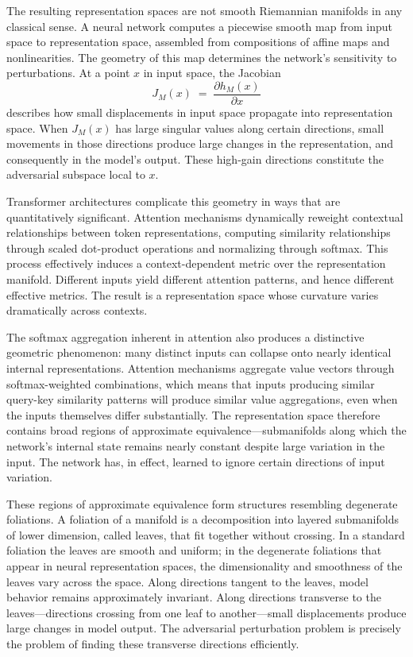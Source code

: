 \documentclass[12pt,a4paper]{article}
\theoremstyle{plain}
\theoremstyle{definition}
\begin{document}
The resulting representation spaces are not smooth Riemannian manifolds in any classical sense. A neural network computes a piecewise smooth map from input space to representation space, assembled from compositions of affine maps and nonlinearities. The geometry of this map determines the network's sensitivity to perturbations. At a point $x$ in input space, the Jacobian
\[
J_M(x) \;=\; \frac{\partial h_M(x)}{\partial x}
\]
describes how small displacements in input space propagate into representation space. When $J_M(x)$ has large singular values along certain directions, small movements in those directions produce large changes in the representation, and consequently in the model's output. These high-gain directions constitute the adversarial subspace local to $x$.

Transformer architectures complicate this geometry in ways that are quantitatively significant. Attention mechanisms dynamically reweight contextual relationships between token representations, computing similarity relationships through scaled dot-product operations and normalizing through softmax. This process effectively induces a context-dependent metric over the representation manifold. Different inputs yield different attention patterns, and hence different effective metrics. The result is a representation space whose curvature varies dramatically across contexts.

The softmax aggregation inherent in attention also produces a distinctive geometric phenomenon: many distinct inputs can collapse onto nearly identical internal representations. Attention mechanisms aggregate value vectors through softmax-weighted combinations, which means that inputs producing similar query-key similarity patterns will produce similar value aggregations, even when the inputs themselves differ substantially. The representation space therefore contains broad regions of approximate equivalence---submanifolds along which the network's internal state remains nearly constant despite large variation in the input. The network has, in effect, learned to ignore certain directions of input variation.

These regions of approximate equivalence form structures resembling degenerate foliations. A foliation of a manifold is a decomposition into layered submanifolds of lower dimension, called leaves, that fit together without crossing. In a standard foliation the leaves are smooth and uniform; in the degenerate foliations that appear in neural representation spaces, the dimensionality and smoothness of the leaves vary across the space. Along directions tangent to the leaves, model behavior remains approximately invariant. Along directions transverse to the leaves---directions crossing from one leaf to another---small displacements produce large changes in model output. The adversarial perturbation problem is precisely the problem of finding these transverse directions efficiently.
\end{document}
